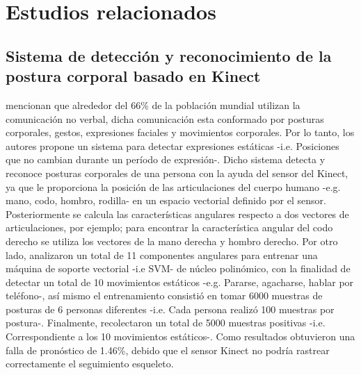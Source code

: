 \documentclass[twoside,twocolumn]{article}
\begin{document}
\section{Estudios relacionados}
\subsection{Sistema de detecci\'on y reconocimiento de la postura corporal basado en Kinect}
 mencionan que alrededor del 66\% de la poblaci\'on mundial  utilizan la comunicaci\'on no verbal, dicha comunicaci\'on esta conformado por posturas corporales, gestos, expresiones faciales y movimientos corporales. Por lo tanto, los autores propone un sistema para detectar expresiones est\'aticas -i.e. Posiciones que no cambian durante un per\'iodo de expresi\'on-.
\medbreak
Dicho sistema detecta y reconoce posturas corporales de una persona con la ayuda del sensor del Kinect, ya que le proporciona la posici\'on de las articulaciones del cuerpo humano -e.g. mano, codo, hombro, rodilla- en un espacio vectorial definido por el sensor. Posteriormente se calcula las caracter\'isticas angulares respecto a dos vectores de articulaciones, por ejemplo; para encontrar la caracter\'istica angular del codo derecho se utiliza los vectores de la mano derecha y hombro derecho.
\medbreak
Por otro lado,  analizaron un total de 11 componentes angulares para entrenar una m\'aquina de soporte vectorial -i.e SVM- de n\'ucleo polin\'omico, con la finalidad de detectar un total de 10 movimientos est\'aticos -e.g. Pararse, agacharse, hablar por tel\'efono-, as\'i mismo el entrenamiento consisti\'o en tomar 6000 muestras de posturas de 6 personas diferentes -i.e. Cada persona realiz\'o 100 muestras por postura-.
\medbreak
Finalmente,  recolectaron un total de 5000 muestras positivas -i.e. Correspondiente a los 10 movimientos est\'aticos-. Como resultados obtuvieron una falla de pron\'ostico de 1.46\%, debido que el sensor Kinect no podr\'ia rastrear correctamente el seguimiento esqueleto.
\end{document}
